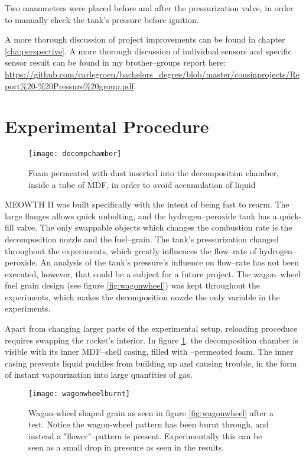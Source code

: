 	Two manometers were placed before and after the pressurization valve, in order to manually check the tank's pressure before ignition.

	A more thorough discussion of project improvements can be found in chapter \ref{cha:perspective}. A more thorough discussion of individual sensors and specific sensor result can be found in my brother--groups report here: \url{https://github.com/carlegroen/bachelors_degree/blob/master/cousinprojects/Report%20-%20Pressure%20group.pdf}.

	\section{Experimental Procedure}

	\begin{figure}
		\centering
		\texttt{[image: decompchamber]}
		\caption{Foam permeated with  dust inserted into the decomposition chamber, inside a tube of MDF, in order to avoid accumulation of liquid }
		\label{fig:kmno4foam2}
	\end{figure}

	MEOWTH II was built specifically with the intent of being fast to rearm. The large flanges allows quick unbolting, and the hydrogen--peroxide tank has a quick-fill valve. The only swappable objects which changes the combustion rate is the decomposition nozzle and the fuel--grain. The tank's pressurization changed throughout the experiments, which greatly influences the flow--rate of hydrogen--peroxide. An analysis of the tank's pressure's influence on flow--rate has not been executed, however, that could be a subject for a future project. The wagon--wheel fuel grain design (see figure \ref{fig:wagonwheel}) was kept throughout the experiments, which makes the decomposition nozzle the only variable in the experiments.

	Apart from changing larger parts of the experimental setup, reloading proceduce requires swapping the rocket's interior. In figure \ref{fig:kmno4foam2}, the decomposition chamber is visible with its inner MDF--shell casing, filled with --permeated foam. The inner casing prevents liquid puddles from building up and causing trouble, in the form of instant vapourization into large quantities of gas.

	\begin{figure}
		\centering
		\texttt{[image: wagonwheelburnt]}
		\caption{Wagon-wheel shaped grain as seen in figure \ref{fig:wagonwheel} after a test. Notice the wagon-wheel pattern has been burnt through, and instead a "flower"--pattern is present. Experimentally this can be seen as a small drop in pressure as seen in the results.}
		\label{fig:burntgrain}
	\end{figure}

